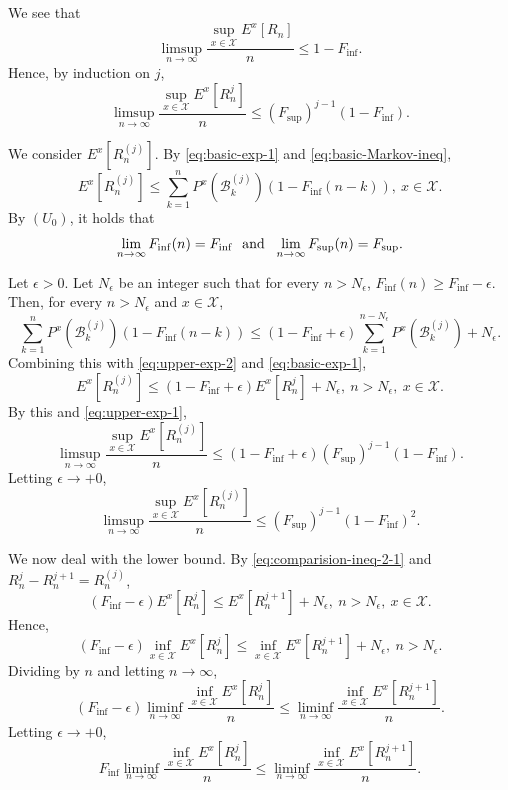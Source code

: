 \documentclass[a4paper, reqno, 11pt]{amsart}
\theoremstyle{definition}
\begin{document}
We see that 
\[ \limsup_{n \to \infty} \frac{\sup_{x \in \mathcal{X}} E^{x} \left[R_n \right]}{n} \le 1 - F_{\inf}. \]
Hence, by induction on $j$, 
\begin{equation}\label{eq:upper-exp-1} 
\limsup_{n \to \infty} \frac{\sup_{x \in \mathcal{X}} E^{x} \left[R_n^j \right]}{n} \le (F_{\sup})^{j-1} (1 - F_{\inf}). 
\end{equation}

We consider $E^x \left[ R^{(j)}_{n} \right]$. 
By \eqref{eq:basic-exp-1} and \eqref{eq:basic-Markov-ineq}, 
\begin{equation}\label{eq:upper-exp-2}  
E^x \left[ R^{(j)}_{n} \right] \le  \sum_{k=1}^{n} P^x \left(\mathcal{B}_{k}^{(j)} \right) (1- F_{\inf}(n-k)),  \ x \in \mathcal{X}.  
\end{equation}
By $(U_0)$, it holds that 
\[ \lim_{n \to \infty} F_{\inf} (n) = F_{\inf} \ \textup{ and } \  \lim_{n \to \infty} F_{\sup} (n) = F_{\sup}. \]

Let $\epsilon > 0$. 
Let $N_{\epsilon}$ be an integer such that for every $n > N_{\epsilon}$, $F_{\inf}(n) \ge F_{\inf} - \epsilon$. 
Then, for every $n > N_{\epsilon}$ and $x \in \mathcal{X}$, 
\begin{equation*}
\sum_{k=1}^{n} P^x \left(\mathcal{B}_{k}^{(j)} \right) (1- F_{\inf}(n-k)) \le (1 - F_{\inf} + \epsilon) \sum_{k=1}^{n - N_{\epsilon}}  P^x \left(\mathcal{B}_{k}^{(j)} \right) + N_{\epsilon}. 
\end{equation*}
Combining this with \eqref{eq:upper-exp-2} and \eqref{eq:basic-exp-1}, 
\begin{equation}\label{eq:comparision-ineq-2-1} 
E^x \left[ R^{(j)}_{n} \right]  \le  (1 - F_{\inf} + \epsilon) E^x \left[ R^{j}_{n} \right]  + N_{\epsilon}, \ n > N_{\epsilon}, \ x \in \mathcal{X}.  
\end{equation}
By this and \eqref{eq:upper-exp-1},
\[ \limsup_{n \to \infty} \frac{\sup_{x \in \mathcal{X}} E^{x} \left[R_n^{(j)} \right]}{n}  \le (1 - F_{\inf} + \epsilon)  (F_{\sup})^{j-1} (1 - F_{\inf}).   \]
Letting $\epsilon \to +0$, 
\[ \limsup_{n \to \infty} \frac{\sup_{x \in \mathcal{X}} E^{x} \left[R_n^{(j)} \right]}{n}  \le (F_{\sup})^{j-1} (1 - F_{\inf})^2.   \]

We now deal with the lower bound. 
By \eqref{eq:comparision-ineq-2-1} and $R_n^j - R_n^{j+1} = R_n^{(j)}$, 
\[ (F_{\inf} - \epsilon) E^x \left[ R^{j}_{n} \right] \le E^x \left[ R^{j+1}_{n} \right] + N_{\epsilon}, \ n > N_{\epsilon}, \ x \in \mathcal{X}. \]
Hence, 
\[ (F_{\inf} - \epsilon) \inf_{x \in \mathcal{X}} E^x \left[ R^{j}_{n} \right] \le \inf_{x \in \mathcal{X}} E^x \left[ R^{j+1}_{n} \right] + N_{\epsilon}, \ n > N_{\epsilon}. \]
Dividing by $n$ and letting $n \to \infty$, 
\[ (F_{\inf} - \epsilon) \liminf_{n \to \infty} \frac{\inf_{x \in \mathcal{X}} E^{x} \left[R_n^j \right]}{n} \le \liminf_{n \to \infty} \frac{\inf_{x \in \mathcal{X}} E^{x} \left[R_n^{j+1} \right]}{n}. \]
Letting $\epsilon \to +0$, 
\[ F_{\inf} \liminf_{n \to \infty} \frac{\inf_{x \in \mathcal{X}} E^{x} \left[R_n^j \right]}{n} \le \liminf_{n \to \infty} \frac{\inf_{x \in \mathcal{X}} E^{x} \left[R_n^{j+1} \right]}{n}. \]
\end{document}
